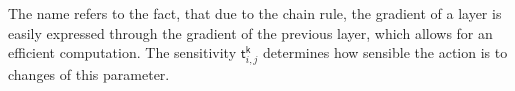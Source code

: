 The name refers to the fact, that due to the chain rule, the gradient of a layer is easily expressed through the gradient of the previous layer, which allows for an efficient computation. The sensitivity $\mathsf{t}^\mathsf{k}_{i,j}$ determines how sensible the action is to changes of this parameter. \cite[p.11-7 - 11-13]{demuth_neural_2014}
